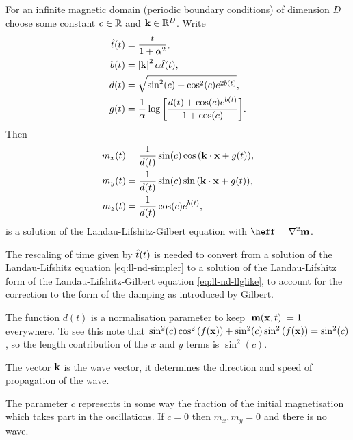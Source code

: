 For an infinite magnetic domain (\ie periodic boundary conditions) of dimension $D$ choose some constant $c \in \mathbb{R}$ and $\mathbf{k} \in \mathbb{R}^D$.
Write
\begin{equation}
  \begin{aligned}
    \hat{t}(t) &= \frac{t}{1 + \alpha^2}, \\
    b(t) &= \left|{\mathbf{k}} \right|^2 \alpha \hat{t}(t), \\
    d(t) &= \sqrt{\sin^2(c) + \cos^2(c)e^{2 b(t)}}, \\
    g(t) &= \frac{1}{\alpha} \log {\left[  \frac{d(t) + \cos(c) e^{b(t)}}{1 + \cos(c)}  \right]}.
  \end{aligned}
\end{equation}
Then
\begin{equation}
  \begin{aligned}
    m_x(t) &= \frac{1}{d(t)} \sin(c) \cos{\left( \mathbf{k}\cdot \mathbf{x}+ g(t)  \right)}, \\
    m_y(t) &= \frac{1}{d(t)} \sin(c) \sin{\left( \mathbf{k}\cdot \mathbf{x}+ g(t)  \right)}, \\
    m_z(t) &= \frac{1}{d(t)} \cos(c) e^{b(t)},
  \end{aligned}
\end{equation}
is a solution of the Landau-Lifshitz-Gilbert equation with $\heff = \lap \mv$.

The rescaling of time given by $\hat{t}(t)$ is needed to convert from a solution of the Landau-Lifshitz equation \cref{eq:ll-nd-simpler} to a solution of the Landau-Lifshitz form of the Landau-Lifshitz-Gilbert equation \cref{eq:ll-nd-llglike}, \ie to account for the correction to the form of the damping as introduced by Gilbert.

The function $d(t)$ is a normalisation parameter to keep $\left|{\mathbf{m}(\mathbf{x}, t)} \right| = 1$ everywhere.
To see this note that $\sin^2(c) \cos^2{\left( f(\mathbf{x}) \right)} + \sin^2(c) \sin^2{\left( f(\mathbf{x}) \right)} = \sin^2(c)$, so the length contribution of the $x$ and $y$ terms is $\sin^2(c)$.

The vector $\mathbf{k}$ is the wave vector, it determines the direction and speed of propagation of the wave.

The parameter $c$ represents in some way the fraction of the initial magnetisation which takes part in the oscillations.
If $c = 0$ then $m_x, m_y = 0$ and there is no wave.

